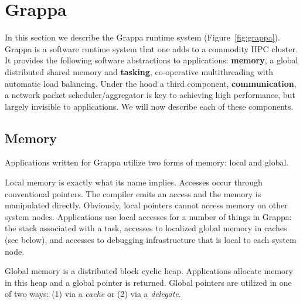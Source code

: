 \section{Grappa} \label{sec:grappa}

In this section we describe the Grappa runtime system (Figure~\ref{fig:grappa}).  Grappa is a software runtime system that one adds to a commodity HPC cluster.  It provides the following software abstractions to applications: \textbf{memory}, a global distributed shared memory and \textbf{tasking}, co-operative multithreading with automatic load balancing.  Under the hood a third component, \textbf{communication}, a network packet scheduler/aggregator is key to achieving high performance, but largely invisible to applications.  We will now describe each of these components.

\subsection{Memory}

Applications written for Grappa utilize two forms of memory: local and global.

Local memory is exactly what its name implies.  Accesses occur through conventional pointers.  The compiler emits an access and the memory is manipulated directly.  Obviously, local pointers cannot access memory on other system nodes.  Applications use local accesses for a number of things in Grappa: the stack associated with a task, accesses to localized global memory in caches (see below), and accesses to debugging infrastructure that is local to each system node.

Global memory is a distributed block cyclic heap.  Applications allocate memory in this heap and a global pointer is returned.  Global pointers are utilized in one of two ways: (1) via a \emph{cache} or (2) via a \emph{delegate}.

